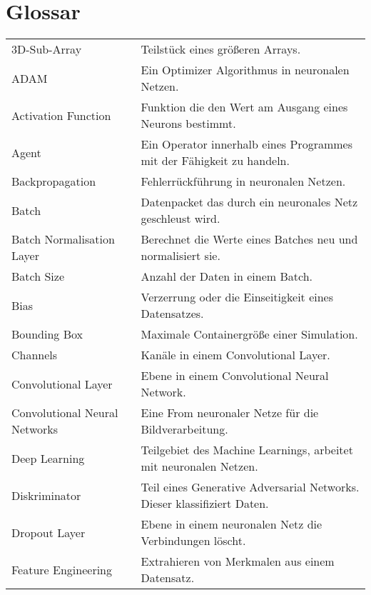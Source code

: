 \chapter*{Glossar}
\thispagestyle{plain}

\begin{table}[ht]
    \begin{tabularx}{\textwidth}{lX}
3D-Sub-Array	&	Teilstück eines größeren Arrays.	\\
ADAM & Ein Optimizer Algorithmus in neuronalen Netzen. \\
Activation Function	&	Funktion die den Wert am Ausgang eines Neurons bestimmt.	\\
Agent	&	Ein Operator innerhalb eines Programmes mit der Fähigkeit zu handeln.	\\
Backpropagation	&	Fehlerrückführung in neuronalen Netzen.	\\
Batch	&	Datenpacket das durch ein neuronales Netz geschleust wird.	\\
Batch Normalisation Layer	&	Berechnet die Werte eines Batches neu und normalisiert sie.	\\
Batch Size	&	Anzahl der Daten in einem Batch.	\\
Bias	&	Verzerrung oder die Einseitigkeit eines Datensatzes.	\\
Bounding Box	&	Maximale Containergröße einer Simulation.	\\
Channels	&	Kanäle in einem Convolutional Layer.	\\
Convolutional Layer	&	Ebene in einem Convolutional Neural Network.	\\
Convolutional Neural Networks	&	Eine From neuronaler Netze für die Bildverarbeitung.	\\
Deep Learning	&	Teilgebiet des Machine Learnings, arbeitet mit neuronalen Netzen.	\\
Diskriminator	&	Teil eines Generative Adversarial Networks. Dieser klassifiziert Daten.	\\
Dropout Layer	&	Ebene in einem neuronalen Netz die Verbindungen löscht.	\\
Feature Engineering	&	Extrahieren von Merkmalen aus einem Datensatz.	\\




     \end{tabularx}
    \label{tab:my_label1}
\end{table}
\thispagestyle{plain}
